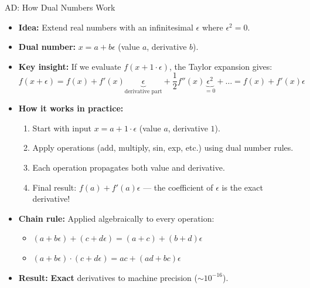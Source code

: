\documentclass[10pt, aspectratio=169]{beamer}
\begin{document}
	\begin{frame}{AD: How Dual Numbers Work}
		\begin{itemize}
			\item \textbf{Idea:} Extend real numbers with an infinitesimal $\epsilon$ where $\epsilon^2 = 0$.
			\item \textbf{Dual number:} $x = a + b\epsilon$ (value $a$, derivative $b$).
			\item \textbf{Key insight:} If we evaluate $f(x + 1\cdot\epsilon)$, the Taylor expansion gives:
			\begin{equation}
				f(x + \epsilon) = f(x) + f'(x)\underbrace{\epsilon}_{\text{derivative part}} + \frac{1}{2}f''(x)\underbrace{\epsilon^2}_{=0} + \dots = f(x) + f'(x)\epsilon
			\end{equation}
			\item \textbf{How it works in practice:}
			\begin{enumerate}
				\item Start with input $x = a + 1\cdot\epsilon$ (value $a$, derivative $1$).
				\item Apply operations (add, multiply, sin, exp, etc.) using dual number rules.
				\item Each operation propagates both value and derivative.
				\item Final result: $f(a) + f'(a)\epsilon$ --- the coefficient of $\epsilon$ is the exact derivative!
			\end{enumerate}
			\item \textbf{Chain rule:} Applied algebraically to every operation:
			\begin{itemize}
				\item $(a + b\epsilon) + (c + d\epsilon) = (a+c) + (b+d)\epsilon$
				\item $(a + b\epsilon) \cdot (c + d\epsilon) = ac + (ad+bc)\epsilon$
			\end{itemize}
			\item \textbf{Result:} \textbf{Exact} derivatives to machine precision ($\sim 10^{-16}$).
		\end{itemize}
	\end{frame}
	
\end{document}
